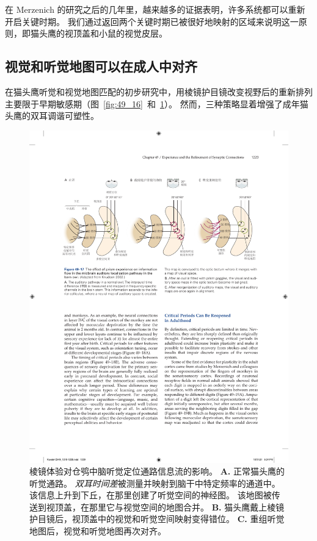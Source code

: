 在 Merzenich 的研究之后的几年里，越来越多的证据表明，许多系统都可以重新开启关键时期。
我们通过返回两个关键时期已被很好地映射的区域来说明这一原则，即猫头鹰的视顶盖和小鼠的视觉皮层。



\subsection{视觉和听觉地图可以在成人中对齐}

在猫头鹰听觉和视觉地图匹配的初步研究中，用棱镜护目镜改变视野后的重新排列主要限于早期敏感期（图~\ref{fig:49_16}~和~\ref{fig:49_17}）。
然而，三种策略显着增强了成年猫头鹰的双耳调谐可塑性。


\begin{figure}[htbp]
	\centering
	\includegraphics[width=0.95\linewidth]{chap49/fig_49_17}
	\caption{棱镜体验对仓鸮中脑听觉定位通路信息流的影响\cite{knudsen2002instructed}。
		\textbf{A.} 正常猫头鹰的听觉通路。
		\textit{双耳时间差}被测量并映射到脑干中特定频率的通道中。
		该信息上升到下丘，在那里创建了听觉空间的神经图。
		该地图被传送到视顶盖，在那里它与视觉空间的地图合并。
		\textbf{B.} 猫头鹰戴上棱镜护目镜后，视顶盖中的视觉和听觉空间映射变得错位。
		\textbf{C.} 重组听觉地图后，视觉和听觉地图再次对齐。}
	\label{fig:49_17}
\end{figure}


